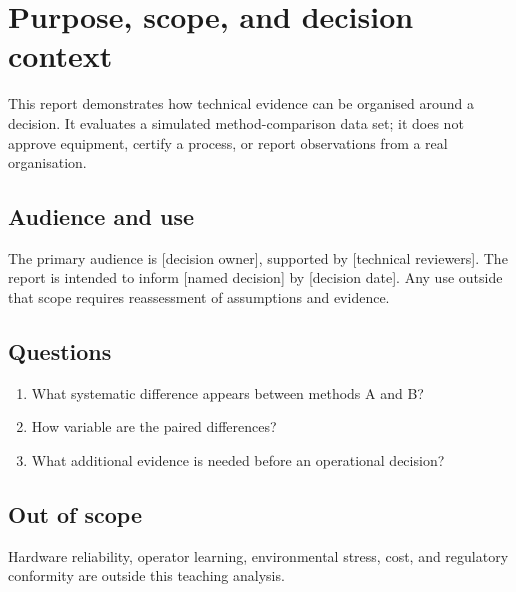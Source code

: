 \chapter{Purpose, scope, and decision context}
\label{chap:context}

This report demonstrates how technical evidence can be organised around a
decision. It evaluates a simulated method-comparison data set; it does not
approve equipment, certify a process, or report observations from a real
organisation.

\section{Audience and use}
The primary audience is [decision owner], supported by [technical reviewers].
The report is intended to inform [named decision] by [decision date]. Any use
outside that scope requires reassessment of assumptions and evidence.

\section{Questions}
\begin{enumerate}
  \item What systematic difference appears between methods A and B?
  \item How variable are the paired differences?
  \item What additional evidence is needed before an operational decision?
\end{enumerate}

\section{Out of scope}
Hardware reliability, operator learning, environmental stress, cost, and
regulatory conformity are outside this teaching analysis.
